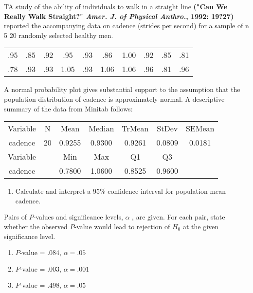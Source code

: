 \documentclass[11pt,letterpaper,boxed]{hmcpset}
\begin{document}
{\begin{problem}[7.3.37a]
	TA study of the ability of individuals to walk in a straight line \textbf{("Can We Really Walk Straight?" \emph{Amer. J. of Physical Anthro.}, 1992: 19?27)} reported the accompanying data on cadence (strides per second) for a sample of n 5 20 randomly selected healthy men.\\
	\begin{center}
		\begin{tabular}{c c c c c c c c c c}
 			.95 & .85 & .92 & .95 & .93 & .86 & 1.00 & .92 & .85 & .81\\
			.78 & .93 & .93 & 1.05 & .93 & 1.06 & 1.06 & .96 & .81 & .96\\
		 \end{tabular}
	\end{center}
A normal probability plot gives substantial support to the assumption that the population distribution of cadence is approximately normal. A descriptive summary of the data from Minitab follows:\\
	\begin{center}
		\begin{tabular}{c | c c c c c c}
 			Variable & N & Mean & Median & TrMean & StDev & SEMean\\
			cadence & 20 & 0.9255 & 0.9300 & 0.9261 & 0.0809 & 0.0181\\
			\hline
			Variable & & Min & Max & Q1 & Q3\\
			cadence & & 0.7800 & 1.0600 & 0.8525 & 0.9600\\
		 \end{tabular}
	\end{center}
	\begin{enumerate}
		\item
			Calculate and interpret a 95$\%$ confidence interval for population mean cadence.
	\end{enumerate}
\end{problem}
\begin{solution}
	\vfill
\end{solution}
\newpage


\begin{problem}[8.1.4abc]
	Pairs of $P$-values and significance levels, $\alpha$ , are given. For each pair, state whether the observed $P$-value would lead to rejection of $H_0$ at the given significance level.\\
	\begin{enumerate}
		\item
			$P$-value = .084, $\alpha = .05$
		\item
			$P$-value = .003, $\alpha = .001$
		\item
			$P$-value = .498, $\alpha = .05$
	\end{enumerate}
\end{problem}
\begin{solution}
	\vfill
\end{solution}
\newpage

}
\end{document}
